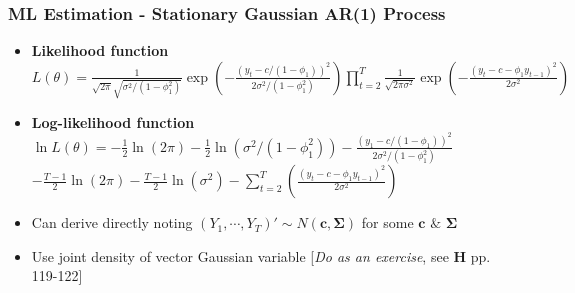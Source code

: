 \documentclass{beamer}
\begin{document}
	
	\begin{frame}
		\frametitle{ML Estimation - Stationary Gaussian AR(1) Process}
		\begin{itemize}
			
			\item[] \textbf{Likelihood function}\\
					\vspace{10pt} 
			\hspace{10pt} $L(\theta)=\frac{1}{\sqrt{2\pi}\sqrt{\sigma^2/(1-\phi_1^2)}}
			\exp\left(-\frac{(y_t-c/(1-\phi_1))^2}{2\sigma^2/(1-\phi_1^2)}\right)\displaystyle \prod_{t=2}^{T}\frac{1}{\sqrt{2\pi\sigma^2}} \exp\left(-\frac{(y_t-c-\phi_1 y_{t-1})^2}{2\sigma^2}\right)$
				\pause	\vspace{25pt} 
			\item[] \textbf{Log-likelihood function}\\
			\vspace{10pt} 
					\hspace{10pt} $\ln L(\theta)=-\frac{1}{2}\ln(2\pi) - \frac{1}{2}\ln(\sigma^2/(1-\phi_1^2))- \frac{(y_1-c/(1-\phi_1))^2}{2\sigma^2/(1-\phi_1^2)}$ \\ \vspace{7pt}
			 \hspace{120pt} $- \frac{T-1}{2}\ln(2\pi) -\frac{T-1}{2}\ln(\sigma^2)-\sum_{t=2}^T \left(\frac{(y_t-c-\phi_1 y_{t-1})^2}{2\sigma^2}\right)$
		\pause	\vspace{20pt} 
	\item[] Can derive directly noting  $(Y_1,\cdots, Y_T)'\sim N(\mathbf{c}, \mathbf{\Sigma})$ for some $\mathbf{c} $ $\&$ $\mathbf{\Sigma}$
		\pause \vspace{10pt} 
	\item[] \hspace{25pt} Use joint density of vector Gaussian variable [\textit{Do as an exercise}, see \textbf{H} pp. 119-122]
\end{itemize}
\end{frame}

	
	
\end{document}
